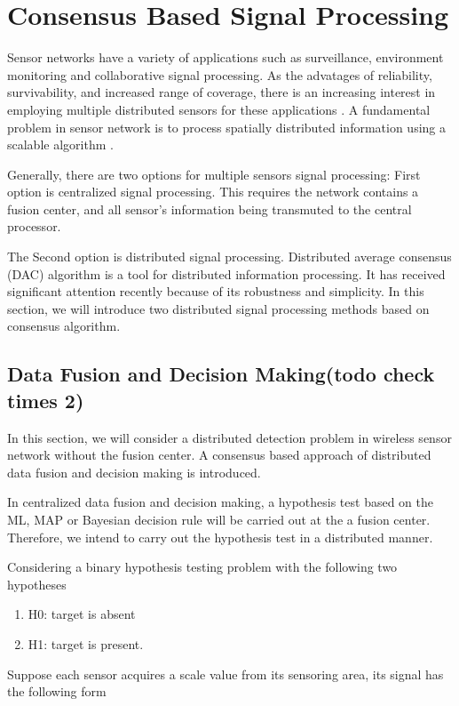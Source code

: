 
\section{Consensus Based Signal Processing}

Sensor networks have a variety of applications such as surveillance,
environment monitoring and collaborative signal processing. As the
advatages of reliability, survivability, and increased range of coverage,
there is an increasing interest in employing multiple distributed
sensors for these applications \cite{Chair1986}. A fundamental problem
in sensor network is to process spatially distributed information
using a scalable algorithm \cite{Olfati-Saber2005a}. 

Generally, there are two options for multiple sensors signal processing:
First option is centralized signal processing. This requires the network
contains a fusion center, and all sensor's information being transmuted
to the central processor. 

The Second option is distributed signal processing. Distributed average
consensus (DAC) algorithm is a tool for distributed information processing.
It has received significant attention recently because of its robustness
and simplicity. In this section, we will introduce two distributed
signal processing methods based on consensus algorithm.


\subsection{Data Fusion and Decision Making(todo check times 2)}

In this section, we will consider a distributed detection problem
in wireless sensor network without the fusion center. A consensus
based approach of distributed data fusion and decision making is introduced.

In centralized data fusion and decision making, a hypothesis test
based on the ML, MAP or Bayesian decision rule will be carried out
at the a fusion center.  Therefore, we intend to carry out the hypothesis
test in a distributed manner. 

Considering a binary hypothesis testing problem with the following
two hypotheses
\begin{enumerate}
\item H0: target is absent
\item H1: target is present.
\end{enumerate}
Suppose each sensor acquires a scale value from its sensoring area,
its signal has the following form

